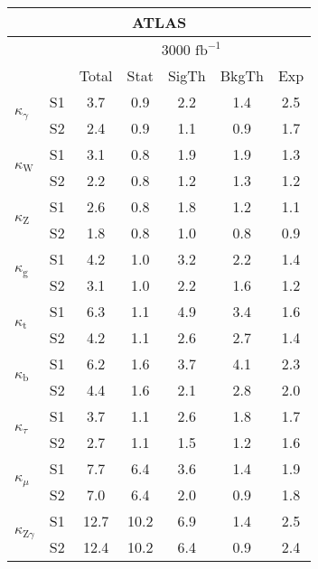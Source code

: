 \begin{tabular}{@{} l c c@{\hskip 0.15in} c c c c @{}}
  \hline
     \multicolumn{7}{c}{ATLAS}\\
 \hline
  &  & \multicolumn{5}{c}{3000 $\text{fb}^{-1}$} \\
  &  & Total & Stat & SigTh & BkgTh & Exp \\
  \hline
  \multirow{2}{*}{$\kappa_{\gamma }$} & S1 & 3.7   & 0.9   & 2.2   & 1.4   & 2.5  \\[1pt]
  & S2& 2.4   & 0.9   & 1.1   & 0.9   & 1.7  \\[4pt]
  \multirow{2}{*}{$\kappa_{\mathrm{W}}$} & S1  & 3.1   & 0.8   & 1.9   & 1.9   & 1.3  \\[1pt]
  & S2 & 2.2   & 0.8   & 1.2   & 1.3   & 1.2  \\[4pt]
  \multirow{2}{*}{$\kappa_{\mathrm{Z}}$} & S1 & 2.6   & 0.8   & 1.8   & 1.2   & 1.1  \\[1pt]
  & S2 & 1.8   & 0.8   & 1.0   & 0.8   & 0.9  \\[4pt]
  \multirow{2}{*}{$\kappa_{\mathrm{g}}$} & S1 & 4.2   & 1.0   & 3.2   & 2.2   & 1.4  \\[1pt]
  & S2 & 3.1   & 1.0   & 2.2   & 1.6   & 1.2  \\[4pt]
  \multirow{2}{*}{$\kappa_{\mathrm{t}}$} & S1 & 6.3   & 1.1   & 4.9   & 3.4   & 1.6  \\[1pt]
  & S2 & 4.2   & 1.1   & 2.6   & 2.7   & 1.4  \\[4pt]
  \multirow{2}{*}{$\kappa_{\mathrm{b}}$} & S1 & 6.2   & 1.6   & 3.7   & 4.1   & 2.3  \\[1pt]
  & S2  & 4.4   & 1.6   & 2.1   & 2.8   & 2.0  \\[4pt]
  \multirow{2}{*}{$\kappa_{\tau }$} & S1 & 3.7 & 1.1   & 2.6   & 1.8   & 1.7  \\[1pt]
  & S2 & 2.7   & 1.1   & 1.5   & 1.2   & 1.6  \\[4pt]
  \multirow{2}{*}{$\kappa_{\mu}$} & S1  & 7.7 & 6.4   & 3.6   & 1.4   & 1.9  \\[1pt]
  & S2 & 7.0   & 6.4   & 2.0   & 0.9   & 1.8  \\[4pt]
  \multirow{2}{*}{$\kappa_{\mathrm{Z}\gamma}$} & S1 & 12.7  & 10.2  & 6.9   & 1.4   & 2.5  \\[1pt]
  & S2 & 12.4  & 10.2  & 6.4   & 0.9   & 2.4  \\[4pt]
  \hline
\end{tabular}
